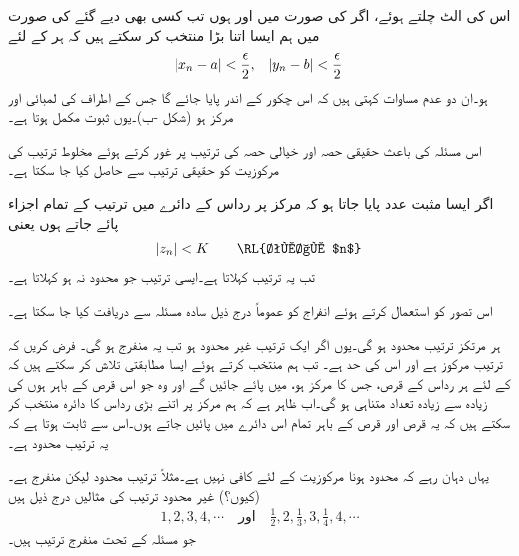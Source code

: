 اس کی الٹ چلتے ہوئے، اگر  کی صورت میں  اور  ہوں  تب کسی بھی دیے گئے  کی صورت میں ہم ایسا  اتنا بڑا منتخب کر سکتے ہیں کہ ہر  کے لئے 
\begin{align*}
\abs{x_n-a}<\frac{\epsilon}{2},\quad \abs{y_n-b}<\frac{\epsilon}{2}
\end{align*}
ہو۔ان دو عدم مساوات کہتی ہیں کہ  اس چکور کے اندر پایا جائے گا جس کے اطراف کی لمبائی  اور مرکز  ہو (شکل -ب)۔یوں ثبوت مکمل ہوتا ہے۔

اس مسئلہ کی باعث حقیقی حصہ اور خیالی حصہ کی ترتیب پر غور کرتے ہوئے مخلوط ترتیب کی مرکوزیت کو حقیقی ترتیب سے حاصل کیا جا سکتا ہے۔

اگر ایسا مثبت عدد  پایا جاتا ہو کہ مرکز پر رداس  کے دائرے میں ترتیب  کے تمام اجزاء  پائے جاتے ہوں  یعنی
\begin{align*}
\abs{z_n}<K \quad \quad \text{\RL{تمام $n$}}
\end{align*}
تب یہ ترتیب  کہلاتا  ہے۔ایسی ترتیب جو محدود نہ ہو  کہلاتا ہے۔

اس تصور کو استعمال کرتے ہوئے انفراج  کو عموماً درج ذیل سادہ مسئلہ  سے دریافت کیا جا سکتا ہے۔

ہر مرتکز ترتیب محدود ہو گی۔یوں اگر ایک ترتیب غیر محدود ہو تب یہ منفرج ہو گی۔
فرض کریں کہ ترتیب  مرکوز ہے اور اس کی حد  ہے۔ تب ہم  منتخب کرتے ہوئے ایسا مطابقتی  تلاش کر سکتے ہیں کہ   کے لئے ہر  رداس  کے قرص، جس کا مرکز  ہو، میں پائے جائیں گے اور وہ   جو اس قرص کے باہر ہوں کی زیادہ سے زیادہ تعداد متناہی ہو گی۔اب ظاہر ہے کہ ہم مرکز پر اتنے بڑی  رداس  کا دائرہ منتخب کر سکتے ہیں کہ یہ قرص اور قرص کے باہر تمام  اس دائرے میں پائیں جاتے ہوں۔اس سے ثابت ہوتا ہے کہ یہ ترتیب محدود ہے۔

یہاں دہان رہے کہ محدود ہونا مرکوزیت کے لئے کافی نہیں ہے۔مثلاً ترتیب  محدود  لیکن منفرج ہے۔ (کیوں؟) غیر محدود ترتیب کی مثالیں درج ذیل ہیں
\begin{align*}
1,2,3,4,\cdots\quad \text{اور}\quad \frac{1}{2},2,\frac{1}{3},3,\frac{1}{4},4,\cdots
\end{align*} 
جو مسئلہ  کے تحت منفرج ترتیب ہیں۔


